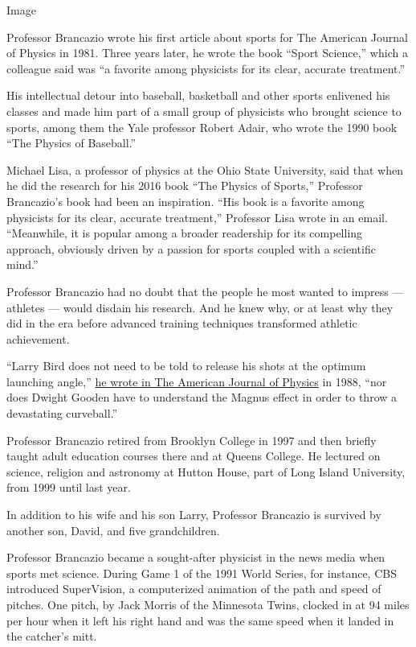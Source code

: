 Image

Professor Brancazio wrote his first article about sports for The
American Journal of Physics in 1981. Three years later, he wrote the
book ``Sport Science,'' which a colleague said was ``a favorite among
physicists for its clear, accurate treatment.''

His intellectual detour into baseball, basketball and other sports
enlivened his classes and made him part of a small group of physicists
who brought science to sports, among them the Yale professor Robert
Adair, who wrote the 1990 book ``The Physics of Baseball.''

Michael Lisa, a professor of physics at the Ohio State University, said
that when he did the research for his 2016 book ``The Physics of
Sports,'' Professor Brancazio's book had been an inspiration. ``His book
is a favorite among physicists for its clear, accurate treatment,''
Professor Lisa wrote in an email. ``Meanwhile, it is popular among a
broader readership for its compelling approach, obviously driven by a
passion for sports coupled with a scientific mind.''

Professor Brancazio had no doubt that the people he most wanted to
impress --- athletes --- would disdain his research. And he knew why, or
at least why they did in the era before advanced training techniques
transformed athletic achievement.

``Larry Bird does not need to be told to release his shots at the
optimum launching angle,''
\href{https://aapt.scitation.org/doi/abs/10.1119/1.15601}{he wrote in
The American Journal of Physics} in 1988, ``nor does Dwight Gooden have
to understand the Magnus effect in order to throw a devastating
curveball.''

Professor Brancazio retired from Brooklyn College in 1997 and then
briefly taught adult education courses there and at Queens College. He
lectured on science, religion and astronomy at Hutton House, part of
Long Island University, from 1999 until last year.

In addition to his wife and his son Larry, Professor Brancazio is
survived by another son, David, and five grandchildren.

Professor Brancazio became a sought-after physicist in the news media
when sports met science. During Game 1 of the 1991 World Series, for
instance, CBS introduced SuperVision, a computerized animation of the
path and speed of pitches. One pitch, by Jack Morris of the Minnesota
Twins, clocked in at 94 miles per hour when it left his right hand and
was the same speed when it landed in the catcher's mitt.

